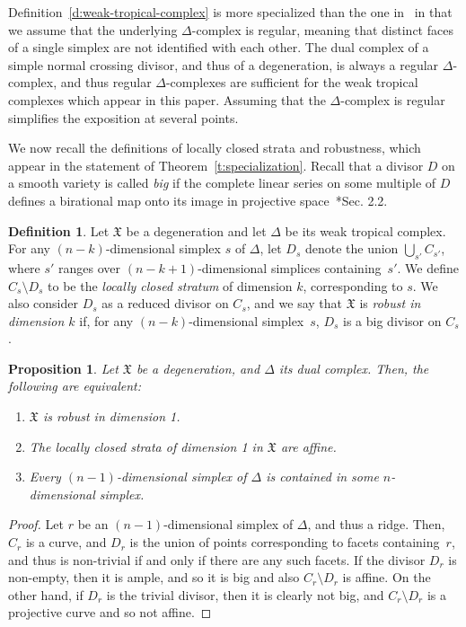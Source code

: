\documentclass[11pt]{amsart}
\newtheorem{prop}[thm]{Proposition}
\theoremstyle{definition}
\newtheorem{defn}[thm]{Definition}
\newcommand{\defi}[1]{\emph{#1}}
\newcommand{\X}{\mathfrak X}
\begin{document}
Definition~\ref{d:weak-tropical-complex} is more specialized than the one
in~\cite{cartwright-complexes} in that we assume that the underlying
$\Delta$-complex is regular, meaning that distinct faces of a single simplex are
not identified with each other. The dual complex of a simple normal crossing
divisor, and thus of a degeneration, is always a regular $\Delta$-complex, and
thus regular $\Delta$-complexes are sufficient for the weak tropical complexes
which appear in this paper. Assuming that the $\Delta$-complex is regular
simplifies the exposition at several points. 

We now recall the definitions of locally closed strata and robustness, which
appear in the statement of Theorem~\ref{t:specialization}. Recall that a divisor
$D$ on a smooth variety is called \defi{big} if the complete linear series on
some multiple of $D$ defines a birational map onto its image in projective
space~\cite{lazarsfeld}*{Sec. 2.2}.

\begin{defn}\label{d:robust-affine-strata}
Let $\X$ be a degeneration and let $\Delta$ be its weak tropical complex. For
any $(n-k)$-dimensional simplex $s$ of $\Delta$, let $D_s$ denote the union
$\bigcup_{s'} C_{s'}$, where $s'$ ranges over $(n-k+1)$-dimensional simplices
containing~$s'$. We define $C_s \setminus D_s$ to be the \defi{locally closed
stratum} of dimension $k$, corresponding to $s$. We also consider $D_s$ as a
reduced divisor on $C_s$, and we say that $\X$ is \defi{robust in dimension $k$}
if, for any $(n-k)$-dimensional simplex~$s$, $D_s$ is a big divisor on $C_s$.
\end{defn}

\begin{prop}\label{p:robust-dim-1}
Let $\X$ be a degeneration, and $\Delta$ its dual complex. Then, the following
are equivalent:
\begin{enumerate}
\item $\X$ is robust in dimension 1.
\item The locally closed strata of dimension 1 in $\X$ are affine.
\item Every $(n-1)$-dimensional simplex of $\Delta$ is contained in some
$n$-dimensional simplex.
\end{enumerate}
\end{prop}

\begin{proof}
Let $r$ be an $(n-1)$-dimensional simplex of $\Delta$, and thus a ridge. Then,
$C_r$ is a curve, and $D_r$ is the union of points corresponding to facets
containing~$r$, and thus is non-trivial if and only if there are any such
facets. If the divisor $D_r$ is non-empty, then it is ample, and so it is big
and also $C_r \setminus D_r$ is affine. On the other hand, if $D_r$ is the
trivial divisor, then it is clearly not big, and $C_r \setminus D_r$ is a
projective curve and so not affine. 
\end{proof}
\end{document}
